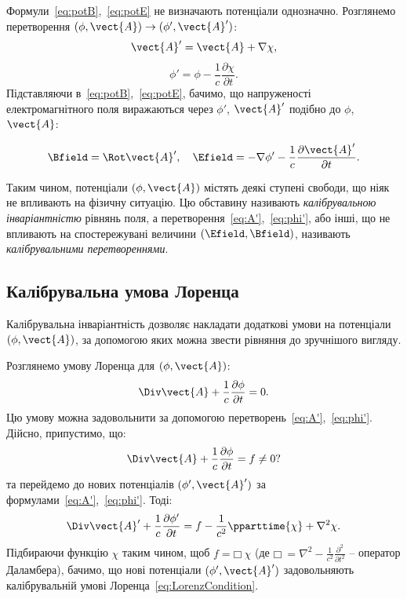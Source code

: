 Формули~\eqref{eq:potB},~\eqref{eq:potE} не визначають потенціали однозначно. Розглянемо перетворення $(\phi, \vect{A}) \to (\phi', \vect{A}')$:
\begin{equation}\label{eq:A'}
	\vect{A}' = \vect{A} + \nabla \chi,
\end{equation}
\begin{equation}\label{eq:phi'}
	\phi' = \phi - \frac{1}{c} \frac{\partial \chi}{\partial t}.
\end{equation}
Підставляючи в~\eqref{eq:potB},~\eqref{eq:potE}, бачимо, що напруженості електромагнітного
поля виражаються через $\phi'$, $\vect{A}'$ подібно до $\phi$, $\vect{A}$:

\begin{equation}
	\Bfield = \Rot \vect{A}', \quad
	\Efield = -\nabla \phi' - \frac{1}{c} \frac{\partial \vect{A}'}{\partial t}.
\end{equation}

Таким чином, потенціали $(\phi, \vect{A})$ містять деякі ступені свободи, що ніяк не
впливають на фізичну ситуацію. Цю обставину називають \emph{калібрувальною
інваріантністю} рівнянь поля, а перетворення~\eqref{eq:A'},~\eqref{eq:phi'}, або інші, що не
впливають на спостережувані величини $(\Efield, \Bfield)$, називають \emph{калібрувальними
перетвореннями}.


\subsection*{Калібрувальна умова Лоренца}

Калібрувальна інваріантність дозволяє накладати додаткові умови на
потенціали $(\phi, \vect{A})$, за допомогою яких можна звести рівняння до зручнішого вигляду.

Розглянемо умову Лоренца для $(\phi, \vect{A})$:
\begin{equation}\label{eq:LorenzCondition}
	\Div \vect{A} + \frac{1}{c} \frac{\partial \phi}{\partial t} = 0.
\end{equation}
Цю умову можна задовольнити за допомогою перетворень~\eqref{eq:A'},~\eqref{eq:phi'}.
Дійсно, припустимо, що:
\begin{equation*}
	\Div \vect{A} + \frac{1}{c} \frac{\partial \phi}{\partial t} = f \neq 0?
\end{equation*}
та перейдемо до нових потенціалів $(\phi', \vect{A}')$ за формулами~\eqref{eq:A'},~\eqref{eq:phi'}. Тоді:
\begin{equation*}
    \Div \vect{A}' + \frac{1}{c} \frac{\partial \phi'}{\partial t} =
	f - \frac{1}{c^2} \pparttime{\chi} + \nabla^2\chi.
\end{equation*}
Підбираючи функцію $\chi$ таким чином, щоб $f = \mdlgwhtsquare\  \chi$
(де $\mdlgwhtsquare\  = \nabla^2 - \frac{1}{c^2} \frac{\partial^2}{\partial t^2}$ – оператор Даламбера), бачимо, що нові потенціали $(\phi',
	\vect{A}')$
задовольняють калібрувальній умові Лоренца~\eqref{eq:LorenzCondition}.

